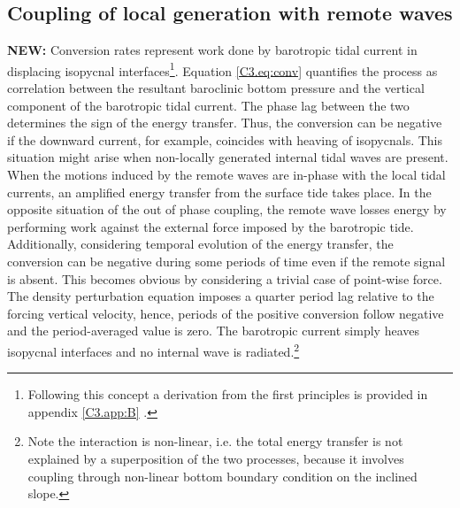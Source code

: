\documentclass[12pt]{article}
\begin{document}
\subsection{Coupling of local generation with remote waves}
\label{C3.sec:amp_mech}
\textbf{NEW:}
\newpage
Conversion rates represent work done by barotropic tidal current in displacing isopycnal 
interfaces\footnote{Following this concept a derivation from the first principles is provided in 
appendix \ref{C3.app:B} \citep[see also][]{kurapov2003m, kelly2010topo}.}. Equation 	
\ref{C3.eq:conv} quantifies the process as correlation between the resultant baroclinic bottom 
pressure and the vertical component of the barotropic tidal current. The phase lag between the two  
determines the sign of the energy transfer. Thus, the conversion can be negative if the downward 
current, for example, coincides with heaving of isopycnals. 
This situation might arise when 
non-locally generated internal tidal waves are present. When the motions induced by the remote 
waves are in-phase with the local tidal currents, an amplified energy transfer from the surface 
tide takes place. In the opposite situation of the out of phase coupling, the remote wave losses 
energy by performing work against the external force imposed by the barotropic tide. Additionally, 
considering temporal evolution of the energy transfer, the conversion can be negative during some 
periods of time even if the remote signal is absent. This becomes obvious by considering a trivial 
case of point-wise force. The density perturbation equation imposes a quarter 
period lag relative to the forcing vertical velocity, hence, periods of the positive conversion 
follow negative and the period-averaged value is zero. The barotropic current simply heaves 
isopycnal 
interfaces and no internal wave is radiated.\footnote{ Note the 
interaction is 
non-linear, i.e. the total energy 
transfer is not 
explained by a superposition of the two processes, because it involves coupling through non-linear 
bottom boundary condition on the inclined slope.}\\
\end{document}
